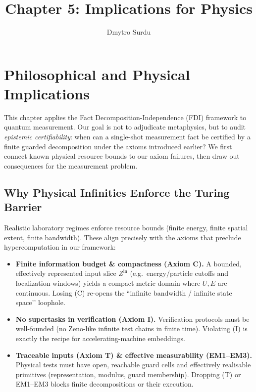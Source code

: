 \documentclass[12pt]{article}
\title{\textbf{Chapter 5: Implications for Physics}}
\author{Dmytro Surdu}
\theoremstyle{definition}
\theoremstyle{plain}
\begin{document}
\maketitle



\section{Philosophical and Physical Implications}
\label{sec:phys-implications}

This chapter applies the Fact Decomposition-Independence (FDI) framework to quantum measurement. Our goal is not to adjudicate metaphysics, but to audit \emph{epistemic certifiability}: when can a single-shot measurement fact be certified by a finite guarded decomposition under the axioms introduced earlier? We first connect known physical resource bounds to our axiom failures, then draw out consequences for the measurement problem.

\subsection{Why Physical Infinities Enforce the Turing Barrier}
\label{subsec:phys-infinities}

Realistic laboratory regimes enforce resource bounds (finite energy, finite spatial extent, finite bandwidth). These align precisely with the axioms that preclude hypercomputation in our framework:

\begin{itemize}[itemsep=4pt]
  \item \textbf{Finite information budget \& compactness (Axiom C).}
  A bounded, effectively represented input slice $Z^{\mathrm{in}}$ (e.g.\ energy/particle cutoffs and localization windows) yields a compact metric domain where $U,E$ are continuous. Losing (C) re-opens the “infinite bandwidth / infinite state space’’ loophole.
  
  \item \textbf{No supertasks in verification (Axiom I).}
  Verification protocols must be well-founded (no Zeno-like infinite test chains in finite time). Violating (I) is exactly the recipe for accelerating-machine embeddings.

  \item \textbf{Traceable inputs (Axiom T) \& effective measurability (EM1–EM3).}
  Physical tests must have open, reachable guard cells and effectively realisable primitives (representation, modulus, guard membership). Dropping (T) or EM1–EM3 blocks finite decompositions or their execution.
\end{itemize}
\end{document}
